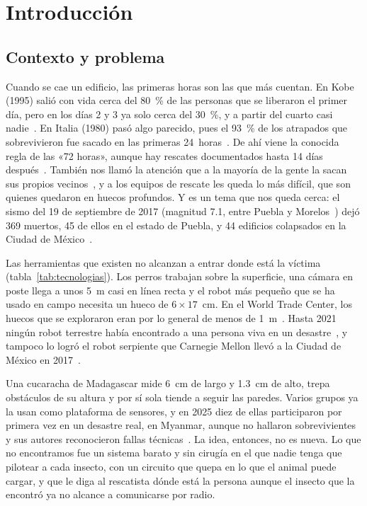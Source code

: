 \section{Introducción}

\subsection{Contexto y problema}

Cuando se cae un edificio, las primeras horas son las que más cuentan. En Kobe (1995) salió con vida cerca del 80~\% de las
personas que se liberaron el primer día, pero en los días 2 y 3 ya solo cerca del 30~\%, y a partir del cuarto casi
nadie~\cite{kawata}. En Italia (1980) pasó algo parecido, pues el 93~\% de los atrapados que sobrevivieron fue sacado en las
primeras 24~horas~\cite{noji}. De ahí viene la conocida regla de las «72 horas», aunque hay rescates documentados hasta 14 días
después~\cite{macintyre}. También nos llamó la atención que a la mayoría de la gente la sacan sus propios
vecinos~\cite{japon2014}, y a los equipos de rescate les queda lo más difícil, que son quienes quedaron en huecos profundos. Y es un tema que nos queda cerca: el sismo del 19 de septiembre de 2017 (magnitud 7.1, entre Puebla y
Morelos~\cite{ssn2017}) dejó 369 muertos, 45 de ellos en el estado de Puebla, y 44 edificios colapsados en la Ciudad de
México~\cite{galvis2020}.

Las herramientas que existen no alcanzan a entrar donde está la víctima (tabla~\ref{tab:tecnologias}). Los perros trabajan
sobre la superficie, una cámara en poste llega a unos 5~m casi en línea recta y el robot más pequeño que se ha usado en
campo necesita un hueco de $6\times17$~cm. En el World Trade Center, los huecos que se exploraron eran por lo general de
menos de 1~m~\cite{murphy2004}. Hasta 2021 ningún robot terrestre había encontrado a una persona viva en un
desastre~\cite{murphy2021}, y tampoco lo logró el robot serpiente que Carnegie Mellon llevó a la Ciudad de México en
2017~\cite{whitman2018}.

Una cucaracha de Madagascar mide 6~cm de largo y 1.3~cm de alto, trepa obstáculos de su altura y por sí sola tiende a
seguir las paredes. Varios grupos ya la usan como plataforma de sensores, y en 2025 diez de ellas participaron por primera
vez en un desastre real, en Myanmar, aunque no hallaron sobrevivientes y sus autores reconocieron fallas
técnicas~\cite{htx2025}. La idea, entonces, no es nueva. Lo que no encontramos fue un sistema barato y sin cirugía en el
que nadie tenga que pilotear a cada insecto, con un circuito que quepa en lo que el animal puede cargar, y que le diga al
rescatista dónde está la persona aunque el insecto que la encontró ya no alcance a comunicarse por radio.

